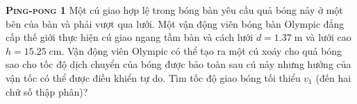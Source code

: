
\begin{problem}{\textbf{\textsc{Ping-pong 1}}} Một cú giao hợp lệ trong bóng bàn yêu cầu quả bóng nảy ở một bên của bàn và phải vượt qua lưới. Một vận động viên bóng bàn Olympic đẳng cấp thế giới thực hiện cú giao ngang tầm bàn và cách lưới $d=1.37\;\mathrm{m}$ và lưới cao $h=15.25\;\mathrm{cm}$. Vận động viên Olympic có thể tạo ra một cú xoáy cho quả bóng sao cho tốc độ dịch chuyển của bóng được bảo toàn sau cú nảy nhưng hướng của vận tốc có thể được điều khiển tự do. Tìm tốc độ giao bóng tối thiểu $v_1$ (đến hai chữ số thập phân)?
	
\end{problem}